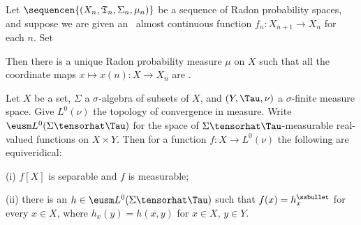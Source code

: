  Let
$\sequencen{(X_n,\frak T_n,\Sigma_n,\mu_n)}$
be a sequence of Radon probability spaces, and suppose we are given an
\imp\ almost continuous function $f_n:X_{n+1}\to X_n$ for each $n$.
Set


\noindent Then there is a unique Radon probability measure $\mu$ on $X$
such that all the coordinate maps $x\mapsto x(n):X\to X_n$ are \imp.


 Let $X$ be a set, $\Sigma$ a $\sigma$-algebra of
subsets of $X$, and $(Y,\Tau,\nu)$ a $\sigma$-finite measure space.
Give $L^0(\nu)$ the topology of convergence in
measure.   Write $\eusm L^0(\Sigma\tensorhat\Tau)$ for
the space of $\Sigma\tensorhat\Tau$-measurable real-valued functions
on $X\times Y$. Then for a function
$f:X\to L^0(\nu)$ the following are equiveridical:

(i) $f[X]$ is separable and $f$ is measurable;

(ii) there is an $h\in\eusm L^0(\Sigma\tensorhat\Tau)$ such that
$f(x)=h_x^{\ssbullet}$ for every $x\in X$, where $h_x(y)=h(x,y)$ for
$x\in X$, $y\in Y$.

